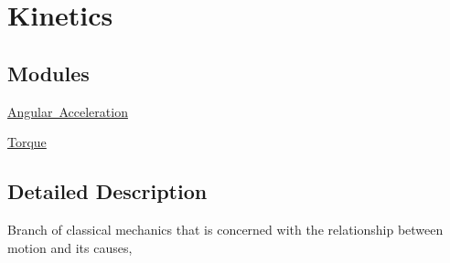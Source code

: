 \hypertarget{group___e_g_x_phys-_kinetics}{}\section{Kinetics}
\label{group___e_g_x_phys-_kinetics}
\subsection*{Modules}
\begin{DoxyCompactItemize}
\item 
\mbox{\hyperlink{group___e_g_x_phys-_kinetics-_angular_acceleration}{Angular Acceleration}}
\item 
\mbox{\hyperlink{group___e_g_x_phys-_kinetics-_torque}{Torque}}
\end{DoxyCompactItemize}


\subsection{Detailed Description}
Branch of classical mechanics that is concerned with the relationship between motion and its causes, 
